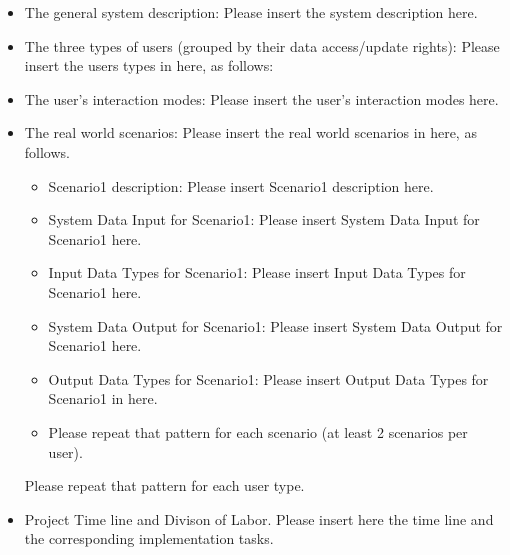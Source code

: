 \begin{itemize} 
\item{The general system description: } 
Please insert the system description here.
\item{The three types of users (grouped by their data access/update rights): }
Please insert the users types in here, as follows:
\item{The user's interaction modes: }
Please insert the user's interaction modes here.
\item{The real world scenarios: }
Please insert the real world scenarios in here, as follows.
	\begin{itemize} 
	\item{Scenario1 description: }
	Please insert Scenario1 description here.
	\item{System Data Input for Scenario1: }
	Please insert System Data Input for Scenario1 here.
	\item{Input Data Types for Scenario1: }
	Please insert Input Data Types for Scenario1 here.
	\item{System Data Output for Scenario1: }
	Please insert System Data Output for Scenario1 here.
	\item{Output Data Types for Scenario1: }
	Please insert Output Data Types for Scenario1 in here.
	\item {Please repeat that pattern for each scenario (at least 2 scenarios per user).}
	\end{itemize}
Please repeat that pattern for each user type.
\item{Project Time line and Divison of Labor.}
Please insert here the time line and the corresponding implementation tasks.
\end{itemize}

